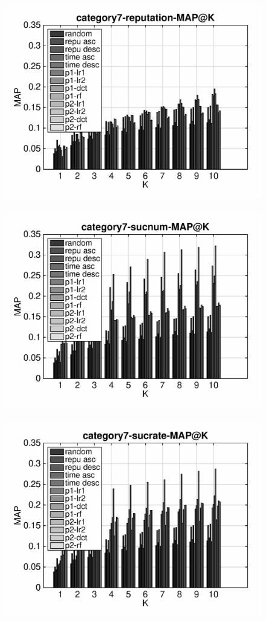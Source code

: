 \documentclass{article}
\begin{document}
\begin{figure}[ht]
\begin{flushleft}
\includegraphics[width=18cm,height=9cm]{category7-reputation-MAP@K.eps}
\includegraphics[width=18cm,height=9cm]{category7-sucnum-MAP@K.eps}
\includegraphics[width=18cm,height=9cm]{category7-sucrate-MAP@K.eps}
\end{flushleft}
\end{figure}
\end{document}
